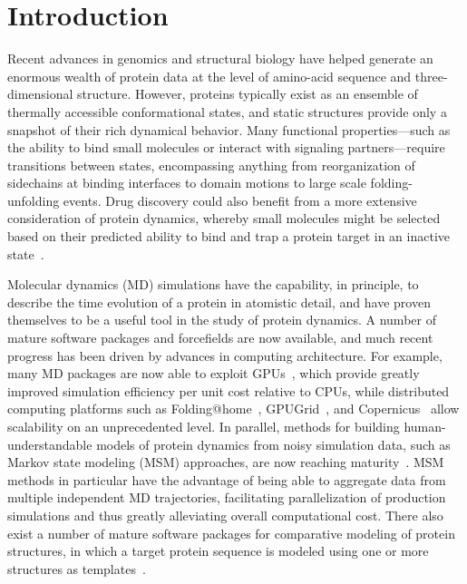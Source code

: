 \documentclass[aps,pre,twocolumn,nofootinbib,superscriptaddress,linenumbers]{revtex4-1}
\begin{document}
\maketitle

\section{Introduction}
\label{section:introduction}

Recent advances in genomics and structural biology have helped generate an enormous wealth of protein data at the level of amino-acid sequence and three-dimensional structure.
However, proteins typically exist as an ensemble of thermally accessible conformational states, and static structures provide only a snapshot of their rich dynamical behavior.
Many functional properties---such as the ability to bind small molecules or interact with signaling partners---require transitions between states, encompassing anything from reorganization of sidechains at binding interfaces to domain motions to large scale folding-unfolding events.
Drug discovery could also benefit from a more extensive consideration of protein dynamics, whereby small molecules might be selected based on their predicted ability to bind and trap a protein target in an inactive state~\cite{craik:science:2009:trapping-moving-targets}.

Molecular dynamics (MD) simulations have the capability, in principle, to describe the time evolution of a protein in atomistic detail, and have proven themselves to be a useful tool in the study of protein dynamics.
A number of mature software packages and forcefields are now available, and much recent progress has been driven by advances in computing architecture.
For example, many MD packages are now able to exploit GPUs~\cite{eastman:jctc:2012:openmm,walker:jctc:2013:amber-gpu}, which provide greatly improved simulation efficiency per unit cost relative to CPUs, while distributed computing platforms such as Folding@home~\cite{shirts-pande:science:2000:fah}, GPUGrid~\cite{buch:2010:gpugrid}, and Copernicus~\cite{pronk:2011:copernicus} allow scalability on an unprecedented level.
In parallel, methods for building human-understandable models of protein dynamics from noisy simulation data, such as Markov state modeling (MSM) approaches, are now reaching maturity~\cite{pande-beauchamp-bowman:2010:methods:markov-model-review,noe:jcp:2010:msm-review,chodera-noe:curr-opin-struct-biol:2014:msm-review}.
MSM methods in particular have the advantage of being able to aggregate data from multiple independent MD trajectories, facilitating parallelization of production simulations and thus greatly alleviating overall computational cost.
There also exist a number of mature software packages for comparative modeling of protein structures, in which a target protein sequence is modeled using one or more structures as templates~\cite{moult:proteins:2014:casp10,baker:science:2001:structure-prediction-review}.
\end{document}
